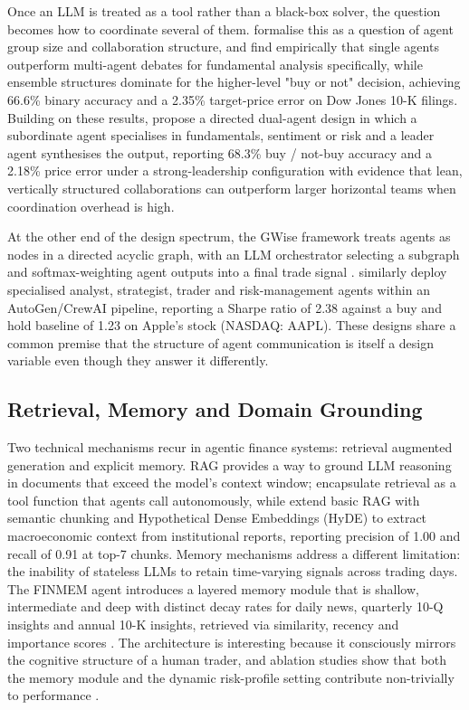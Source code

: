 Once an LLM is treated as a tool rather than a black-box solver, the
question becomes how to coordinate several of them. \citet{han2024}
formalise this as a question of agent group size and collaboration
structure, and find empirically that single agents outperform
multi-agent debates for fundamental analysis specifically, while
ensemble structures dominate for the higher-level "buy or not"
decision, achieving 66.6\% binary accuracy and a 2.35\%
target-price error on Dow Jones 10-K filings. Building on these
results, \citet{chen2025dda} propose a directed dual-agent design
in which a subordinate agent specialises in fundamentals, sentiment
or risk and a leader agent synthesises the output, reporting
68.3\% buy / not-buy accuracy and a 2.18\% price error
under a strong-leadership configuration with evidence that lean,
vertically structured collaborations can outperform larger horizontal
teams when coordination overhead is high.

At the other end of the design spectrum, the GWise framework treats
agents as nodes in a directed acyclic graph, with an LLM orchestrator
selecting a subgraph and softmax-weighting agent outputs into a final
trade signal \citep{rezaei2025gwise}. \citet{Cheng2025} similarly
deploy specialised analyst, strategist, trader and risk-management
agents within an AutoGen/CrewAI pipeline, reporting a Sharpe ratio
of 2.38 against a buy and hold baseline of 1.23 on Apple's stock (NASDAQ: AAPL). These
designs share a common premise that the structure of agent
communication is itself a design variable even though they answer
it differently.

\subsection{Retrieval, Memory and Domain Grounding}
\label{sec:retrievalmemory}

Two technical mechanisms recur in agentic finance systems:
retrieval augmented generation and explicit memory. RAG provides a
way to ground LLM reasoning in documents that exceed the model's
context window; \citet{han2024} encapsulate retrieval as a tool
function that agents call autonomously, while \citet{Fatouros2025MarketSense}
extend basic RAG with semantic chunking and Hypothetical Dense
Embeddings (HyDE) to extract macroeconomic context from institutional
reports, reporting precision of 1.00 and recall of 0.91 at top-7
chunks. Memory mechanisms address a different limitation: the
inability of stateless LLMs to retain time-varying signals across
trading days. The FINMEM agent introduces a layered memory module that is shallow, intermediate and deep with distinct decay rates for
daily news, quarterly 10-Q insights and annual 10-K insights,
retrieved via similarity, recency and importance scores
\citep{yu2025finmem}. The architecture is interesting because it
consciously mirrors the cognitive structure of a human trader, and
ablation studies show that both the memory module and the dynamic
risk-profile setting contribute non-trivially to performance
\citep{yu2025finmem}.

